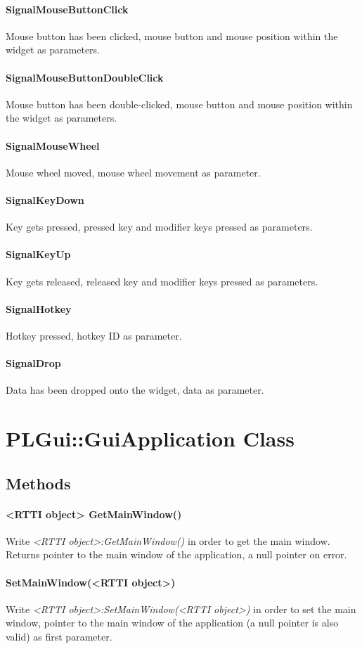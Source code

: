 \paragraph{SignalMouseButtonClick}
Mouse button has been clicked, mouse button and mouse position within the widget as parameters.

\paragraph{SignalMouseButtonDoubleClick}
Mouse button has been double-clicked, mouse button and mouse position within the widget as parameters.

\paragraph{SignalMouseWheel}
Mouse wheel moved, mouse wheel movement as parameter.

\paragraph{SignalKeyDown}
Key gets pressed, pressed key and modifier keys pressed as parameters.

\paragraph{SignalKeyUp}
Key gets released, released key and modifier keys pressed as parameters.

\paragraph{SignalHotkey}
Hotkey pressed, hotkey ID as parameter.

\paragraph{SignalDrop}
Data has been dropped onto the widget, data as parameter.




\section{PLGui::GuiApplication Class}


\subsection{Methods}

\paragraph{<RTTI object> GetMainWindow()}
Write \emph{<RTTI object>:GetMainWindow()} in order to get the main window. Returns pointer to the main window of the application, a null pointer on error.

\paragraph{SetMainWindow(<RTTI object>)}
Write \emph{<RTTI object>:SetMainWindow(<RTTI object>)} in order to set the main window, pointer to the main window of the application (a null pointer is also valid) as first parameter.
